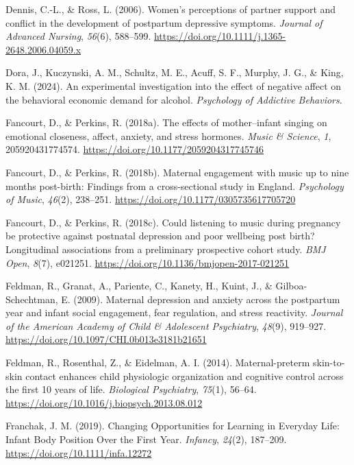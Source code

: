 \documentclass[
]{article}
\newlength{\cslhangindent}
\newenvironment{CSLReferences}[2] %
 {\begin{list}{}{%
  \setlength{\itemindent}{0pt}
  \setlength{\leftmargin}{0pt}
  \setlength{\parsep}{0pt}
  \ifodd #1
   \setlength{\leftmargin}{\cslhangindent}
   \setlength{\itemindent}{-1\cslhangindent}
  \fi
  \setlength{\itemsep}{#2\baselineskip}}}
 {\end{list}}
\begin{document}
\begin{CSLReferences}{1}{0}
Dennis, C.-L., \& Ross, L. (2006). Women's perceptions of partner
support and conflict in the development of postpartum depressive
symptoms. \emph{Journal of Advanced Nursing}, \emph{56}(6), 588--599.
\url{https://doi.org/10.1111/j.1365-2648.2006.04059.x}

Dora, J., Kuczynski, A. M., Schultz, M. E., Acuff, S. F., Murphy, J. G.,
\& King, K. M. (2024). An experimental investigation into the effect of
negative affect on the behavioral economic demand for alcohol.
\emph{Psychology of Addictive Behaviors}.

Fancourt, D., \& Perkins, R. (2018a). The effects of mother--infant
singing on emotional closeness, affect, anxiety, and stress hormones.
\emph{Music \& Science}, \emph{1}, 205920431774574.
\url{https://doi.org/10.1177/2059204317745746}

Fancourt, D., \& Perkins, R. (2018b). Maternal engagement with music up
to nine months post-birth: {Findings} from a cross-sectional study in
{England}. \emph{Psychology of Music}, \emph{46}(2), 238--251.
\url{https://doi.org/10.1177/0305735617705720}

Fancourt, D., \& Perkins, R. (2018c). Could listening to music during
pregnancy be protective against postnatal depression and poor wellbeing
post birth? {Longitudinal} associations from a preliminary prospective
cohort study. \emph{BMJ Open}, \emph{8}(7), e021251.
\url{https://doi.org/10.1136/bmjopen-2017-021251}

Feldman, R., Granat, A., Pariente, C., Kanety, H., Kuint, J., \&
Gilboa-Schechtman, E. (2009). Maternal depression and anxiety across the
postpartum year and infant social engagement, fear regulation, and
stress reactivity. \emph{Journal of the American Academy of Child \&
Adolescent Psychiatry}, \emph{48}(9), 919--927.
\url{https://doi.org/10.1097/CHI.0b013e3181b21651}

Feldman, R., Rosenthal, Z., \& Eidelman, A. I. (2014). Maternal-preterm
skin-to-skin contact enhances child physiologic organization and
cognitive control across the first 10 years of life. \emph{Biological
Psychiatry}, \emph{75}(1), 56--64.
\url{https://doi.org/10.1016/j.biopsych.2013.08.012}

Franchak, J. M. (2019). Changing {Opportunities} for {Learning} in
{Everyday Life}: {Infant Body Position Over} the {First Year}.
\emph{Infancy}, \emph{24}(2), 187--209.
\url{https://doi.org/10.1111/infa.12272}


\end{CSLReferences}
\end{document}
